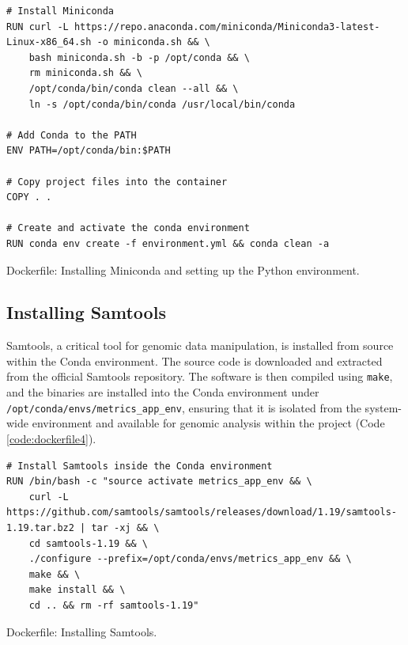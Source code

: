 \begin{longlisting}
\begin{verbatim}
# Install Miniconda
RUN curl -L https://repo.anaconda.com/miniconda/Miniconda3-latest-Linux-x86_64.sh -o miniconda.sh && \
    bash miniconda.sh -b -p /opt/conda && \
    rm miniconda.sh && \
    /opt/conda/bin/conda clean --all && \
    ln -s /opt/conda/bin/conda /usr/local/bin/conda

# Add Conda to the PATH
ENV PATH=/opt/conda/bin:$PATH

# Copy project files into the container
COPY . .

# Create and activate the conda environment
RUN conda env create -f environment.yml && conda clean -a
\end{verbatim}
\caption{Dockerfile: Installing Miniconda and setting up the Python environment.}
\label{code:dockerfile3}
\end{longlisting}

\subsection{Installing Samtools}

Samtools, a critical tool for genomic data manipulation, is installed from source within the Conda environment. The source code is downloaded and extracted from the official Samtools repository. The software is then compiled using \texttt{make}, and the binaries are installed into the Conda environment under \texttt{/opt/conda/envs/metrics\_app\_env}, ensuring that it is isolated from the system-wide environment and available for genomic analysis within the project (Code \ref{code:dockerfile4}).

\begin{longlisting}
\begin{verbatim}
# Install Samtools inside the Conda environment
RUN /bin/bash -c "source activate metrics_app_env && \
    curl -L https://github.com/samtools/samtools/releases/download/1.19/samtools-1.19.tar.bz2 | tar -xj && \
    cd samtools-1.19 && \
    ./configure --prefix=/opt/conda/envs/metrics_app_env && \
    make && \
    make install && \
    cd .. && rm -rf samtools-1.19"
\end{verbatim}
\caption{Dockerfile: Installing Samtools.}
\label{code:dockerfile4}
\end{longlisting}

